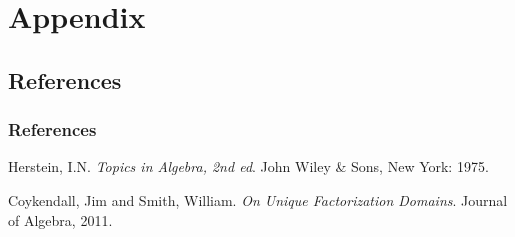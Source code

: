 \appendix

\section*{Appendix}

\subsection*{References}

\begin{frame}
  \frametitle[allowframebreaks]{References}

  \begin{thebibliography}{2}
    \beamertemplatebookbibitems

      Herstein, I.N.
      \newblock \emph{Topics in Algebra, 2nd ed}.
      \newblock John Wiley \& Sons, New York: 1975.

    \beamertemplatearticlebibitems
      Coykendall, Jim and Smith, William.
      \newblock\emph{On Unique Factorization Domains}.
      \newblock Journal of Algebra, 2011.
  \end{thebibliography}
\end{frame}
